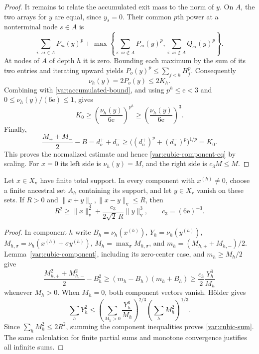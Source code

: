 \begin{proof}
It remains to relate the accumulated exit mass to the norm of $y$.
On $A$, the two arrays for $y$ are equal, since $y_s=0$.
Their common $p$th power at a nonterminal node $s\in A$ is
\[
 \sum_{i:\,si\in A}P_{si}(y)^p+
 \max\left\{\sum_{i:\,si\notin A}P_{si}(y)^p,
             \sum_{i:\,si\notin A}Q_{si}(y)^p\right\}.
\]
At nodes of $A$ of depth $h$ it is zero.  Bounding each maximum by the sum
of its two entries and iterating upward yields
$P_o(y)^p\le\sum_{j<h}H_j^p$.  Consequently
\[
 \nu_h(y)=2P_o(y)\le2K_h.
\]
Combining with \eqref{var:accumulated-bound}, and using
$p^h\le\mathrm e<3$ and $0\le\nu_h(y)/(6\mathrm e)\le1$, gives
\[
 K_0\ge\left(\frac{\nu_h(y)}{6\mathrm e}\right)^{p^h}
      \ge\left(\frac{\nu_h(y)}{6\mathrm e}\right)^3.
\]
Finally,
\[
 \frac{M_++M_-}{2}-B=d_o^++d_o^-\ge
 \bigl((d_o^+)^p+(d_o^-)^p\bigr)^{1/p}=K_0.
\]
This proves the normalized estimate and hence
\eqref{var:cubic-component-eq} by scaling.  For $x=0$ its left
side is $\nu_h(y)=M$, and the right side is $c_3M\le M$.
\end{proof}

\begin{theorem}\label{var:cubic-stability}
Let $x\in X_{\mathrm v}$ have finite total support.  In every
component with $x^{(h)}\ne0$, choose a finite ancestral set $A_h$
containing its support, and let $y\in X_{\mathrm v}$ vanish on these
sets.  If $R>0$ and $\|x+y\|_{\mathrm v},\|x-y\|_{\mathrm v}\le R$,
then
\begin{equation}\label{var:cubic-sum}
 R^2\ge\|x\|_{\mathrm v}^2+
       \frac{c_3}{2\sqrt2\,R}\|y\|_{\mathrm v}^3,
 \qquad c_3=(6\mathrm e)^{-3}.
\end{equation}
\end{theorem}

\begin{proof}
In component $h$ write
$B_h=\nu_h(x^{(h)})$, $Y_h=\nu_h(y^{(h)})$,
$M_{h,\sigma}=\nu_h(x^{(h)}+\sigma y^{(h)})$,
$M_h=\max_\sigma M_{h,\sigma}$, and
$m_h=(M_{h,+}+M_{h,-})/2$.
Lemma~\ref{var:cubic-component}, including its zero-center case,
and $m_h\ge M_h/2$ give
\[
 \frac{M_{h,+}^2+M_{h,-}^2}{2}-B_h^2
 \ge(m_h-B_h)(m_h+B_h)
 \ge\frac{c_3}{2}\frac{Y_h^3}{M_h}
\]
whenever $M_h>0$.  When $M_h=0$, both component vectors vanish.
H\"older gives
\[
 \sum_hY_h^2
 \le\left(\sum_{M_h>0}\frac{Y_h^3}{M_h}\right)^{2/3}
       \left(\sum_hM_h^2\right)^{1/3}.
\]
Since $\sum_hM_h^2\le2R^2$, summing the component inequalities
proves \eqref{var:cubic-sum}.  The same calculation for finite
partial sums and monotone convergence justifies all infinite sums.
\end{proof}

